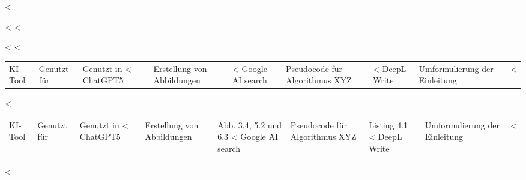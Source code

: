 {{{{{{{{\lipsum[1]

<%

<%
<%

<%
<%
\begin{tabular}{lll}
  \toprule
  KI-Tool          & Genutzt für                    & Genutzt in               <%
  \midrule
  ChatGPT5         & Erstellung von Abbildungen     & <%
  Google AI search & Pseudocode für Algorithmus XYZ & <%
  DeepL Write      & Umformulierung der Einleitung  & <%
  \bottomrule
\end{tabular}
<%
\begin{tabular}{lll}
  \toprule
  KI-Tool          & Genutzt für                    & Genutzt in              <%
  \midrule
  ChatGPT5         & Erstellung von Abbildungen     & Abb. 3.4, 5.2 und 6.3   <%
  Google AI search & Pseudocode für Algorithmus XYZ & Listing 4.1             <%
  DeepL Write      & Umformulierung der Einleitung  & <%
  \bottomrule
\end{tabular}
<%

}}}}}}}}
